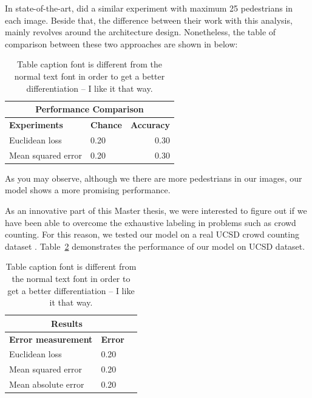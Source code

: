 \noindent In state-of-the-art, \citeauthor*{segui2015learning} did a similar experiment with maximum 25 pedestrians in each image. Beside that, the difference between their work with this analysis, mainly revolves around the architecture design. Nonetheless, the table of comparison between these two approaches are shown in below:
 
\begin{table}[H]
\centering
\small\sffamily
\begin{tabular}{llr}
\multicolumn{3}{c}{\textbf{\textbf{Performance Comparison}}} \\
\bottomrule
\textbf{Experiments}  & \textbf{Chance} & \textbf{Accuracy} \\
\bottomrule
Euclidean loss           & 0.20 & 0.30 \\
Mean squared error       & 0.20 & 0.30 \\
\bottomrule
\end{tabular}
\caption{Table caption font is different from the normal text font in order to get a better differentiation -- I like it that way.}
\label{tab:}
\end{table} 

As you may observe, although we there are more pedestrians in our images, our model shows a more promising performance. 

\noindent As an innovative part of this Master thesis, we were interested to figure out if we have been able to overcome the exhaustive labeling in problems such as crowd counting. For this reason, we tested our model on a real UCSD crowd counting dataset \cite{chan2008privacy}. Table~\ref{tab:ucsdreal} demonstrates the performance of our model on UCSD dataset.


\begin{table}[H]
\centering
\small\sffamily
\begin{tabular}{llr}
\multicolumn{2}{c}{\textbf{\textbf{Results}}} \\
\bottomrule
\textbf{Error measurement}        & \textbf{Error} \\
\bottomrule
Euclidean loss           & 0.20  \\
Mean squared error       & 0.20  \\
Mean absolute error      & 0.20  \\
\bottomrule
\end{tabular}
\caption{Table caption font is different from the normal text font in order to get a better differentiation -- I like it that way.}
\label{tab:ucsdreal}
\end{table} 

